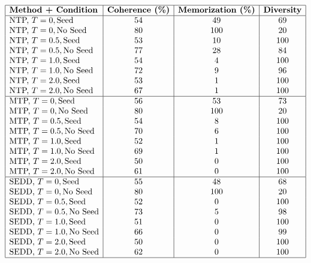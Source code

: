 \documentclass{article} %
\begin{document}
\[
\begin{array}{|l|c|c|c|}
\hline
\textbf{Method + Condition} & \textbf{Coherence (\%)} & \textbf{Memorization (\%)} & \textbf{Diversity} \\
\hline
\text{NTP, } T=0, \text{Seed}     & 54  & 49   & 69 \\
\text{NTP, } T=0, \text{No Seed}  & 80  & 100  & 20 \\
\text{NTP, } T=0.5, \text{Seed}   & 53  & 10   & 100 \\
\text{NTP, } T=0.5, \text{No Seed}& 77  & 28   & 84 \\
\text{NTP, } T=1.0, \text{Seed}   & 54  & 4    & 100 \\
\text{NTP, } T=1.0, \text{No Seed}& 72  & 9    & 96 \\
\text{NTP, } T=2.0, \text{Seed}   & 53  & 1    & 100 \\
\text{NTP, } T=2.0, \text{No Seed}& 67  & 1    & 100 \\
\hline
\text{MTP, } T=0, \text{Seed}     & 56  & 53   & 73 \\
\text{MTP, } T=0, \text{No Seed}  & 80  & 100  & 20 \\
\text{MTP, } T=0.5, \text{Seed}   & 54  & 8    & 100 \\
\text{MTP, } T=0.5, \text{No Seed}& 70  & 6    & 100 \\
\text{MTP, } T=1.0, \text{Seed}   & 52  & 1    & 100 \\
\text{MTP, } T=1.0, \text{No Seed}& 69  & 1    & 100 \\
\text{MTP, } T=2.0, \text{Seed}   & 50  & 0    & 100 \\
\text{MTP, } T=2.0, \text{No Seed}& 61  & 0    & 100 \\
\hline
\text{SEDD, } T=0, \text{Seed}    & 55  & 48   & 68 \\
\text{SEDD, } T=0, \text{No Seed} & 80  & 100  & 20 \\
\text{SEDD, } T=0.5, \text{Seed}  & 52  & 0    & 100 \\
\text{SEDD, } T=0.5, \text{No Seed}& 73  & 5    & 98 \\
\text{SEDD, } T=1.0, \text{Seed}  & 51  & 0    & 100 \\
\text{SEDD, } T=1.0, \text{No Seed}& 66  & 0    & 99 \\
\text{SEDD, } T=2.0, \text{Seed}  & 50  & 0    & 100 \\
\text{SEDD, } T=2.0, \text{No Seed}& 62  & 0    & 100 \\
\hline
\end{array}
\]
\vspace{1em}
\end{document}
